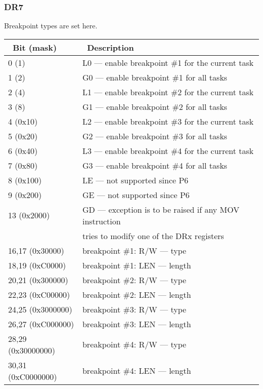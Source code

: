\subsubsection{DR7}

Breakpoint types are set here.

\begin{center}
\begin{tabular}{ | l | l | }
\hline
\headercolor\ Bit (mask) &
\headercolor\ Description \\
\hline
0 (1)       &  L0 --- enable breakpoint \#1 for the current task \\
\hline
1 (2)       &  G0 --- enable breakpoint \#1 for all tasks \\
\hline
2 (4)       &  L1 --- enable breakpoint \#2 for the current task \\
\hline
3 (8)       &  G1 --- enable breakpoint \#2 for all tasks \\
\hline
4 (0x10)    &  L2 --- enable breakpoint \#3 for the current task \\
\hline
5 (0x20)    &  G2 --- enable breakpoint \#3 for all tasks \\
\hline
6 (0x40)    &  L3 --- enable breakpoint \#4 for the current task \\
\hline
7 (0x80)    &  G3 --- enable breakpoint \#4 for all tasks \\
\hline
8 (0x100)   &  LE --- not supported since P6 \\
\hline
9 (0x200)   &  GE --- not supported since P6 \\
\hline
13 (0x2000) &  GD --- exception is to be raised if any MOV instruction \\
            & tries to modify one of the DRx registers \\
\hline
16,17 (0x30000)    &  breakpoint \#1: R/W --- type \\
\hline
18,19 (0xC0000)    &  breakpoint \#1: LEN --- length \\
\hline
20,21 (0x300000)   &  breakpoint \#2: R/W --- type \\
\hline
22,23 (0xC00000)   &  breakpoint \#2: LEN --- length \\
\hline
24,25 (0x3000000)  &  breakpoint \#3: R/W --- type \\
\hline
26,27 (0xC000000)  &  breakpoint \#3: LEN --- length \\
\hline
28,29 (0x30000000) &  breakpoint \#4: R/W --- type \\
\hline
30,31 (0xC0000000) &  breakpoint \#4: LEN --- length \\
\hline
\end{tabular}
\end{center}


